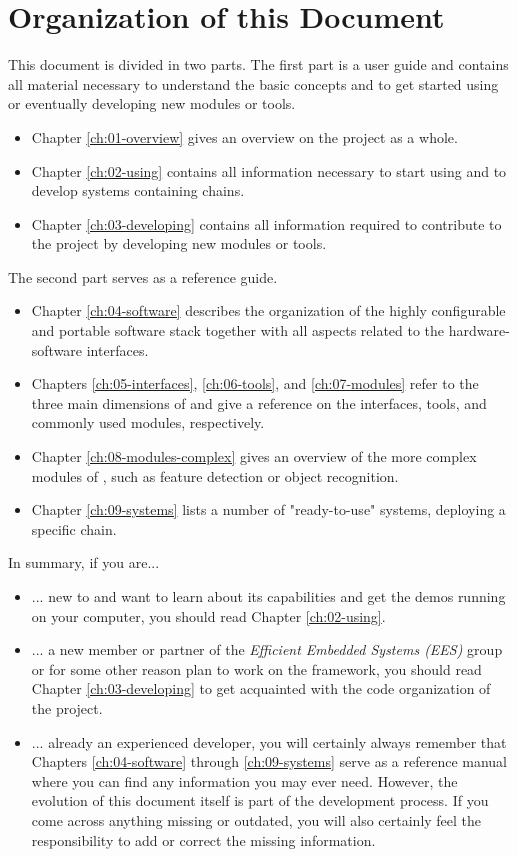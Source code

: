 \section{Organization of this Document}

This document is divided in two parts. The first part is a user guide and contains all material necessary to understand the basic concepts and to get started using \asterics or eventually developing new \asterics modules or tools.
\begin{itemize}
\item Chapter \ref{ch:01-overview} gives an overview on the \asterics project as a whole.
\item Chapter \ref{ch:02-using} contains all information necessary to start using \asterics and to develop systems containing \asterics chains.
\item Chapter \ref{ch:03-developing} contains all information required to contribute to the \asterics project by developing new modules or tools.
\end{itemize}

The second part serves as a reference guide. 
\begin{itemize}
\item Chapter \ref{ch:04-software} describes the organization of the highly configurable and portable software stack together with all aspects related to the hardware-software interfaces.
\item Chapters \ref{ch:05-interfaces}, \ref{ch:06-tools}, and \ref{ch:07-modules} refer to the three main dimensions of \asterics and give a reference on the interfaces, tools, and commonly used modules, respectively.
\item Chapter \ref{ch:08-modules-complex} gives an overview of the more complex modules of \asterics, such as feature detection or object recognition.
\item Chapter \ref{ch:09-systems} lists a number of "ready-to-use" systems, deploying a specific \asterics chain.
\end{itemize}

In summary, if you are...
\begin{itemize}
\item ... new to \asterics and want to learn about its capabilities and get the demos running on your computer, you should read Chapter \ref{ch:02-using}.
\item ... a new member or partner of the \textit{Efficient Embedded Systems (EES)} group or for some other reason plan to work on the \asterics framework, you should read Chapter \ref{ch:03-developing} to get acquainted with the code organization of the project.
\item ... already an experienced \asterics developer, you will certainly always remember that Chapters \ref{ch:04-software} through \ref{ch:09-systems} serve as a reference manual where you can find any information you may ever need. However, the evolution of this document itself is part of the \asterics development process. If you come across anything missing or outdated, you will also certainly feel the responsibility to add or correct the missing information.
\end{itemize}



